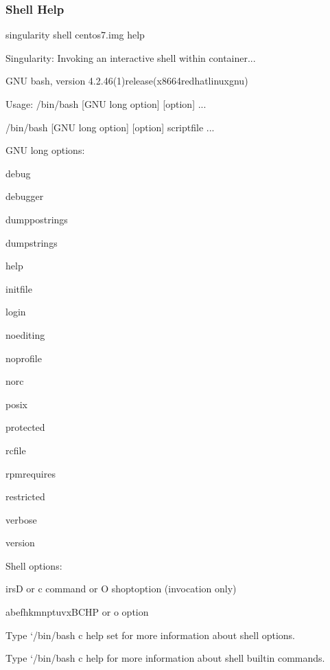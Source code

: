 \documentclass[letterpaper,10pt,english]{sphinxmanual}
\begin{document}
\subsubsection{Shell Help}
\label{\detokenize{appendix:shell-help}}
%
\begin{sphinxVerbatim}[commandchars=\\\{\}]
\PYGZdl{} singularity shell centos7.img \PYGZhy{}\PYGZhy{}help

Singularity: Invoking an interactive shell within container...


GNU bash, version 4.2.46(1)\PYGZhy{}release\PYGZhy{}(x86\PYGZus{}64\PYGZhy{}redhat\PYGZhy{}linux\PYGZhy{}gnu)

Usage:  /bin/bash [GNU long option] [option] ...

    /bin/bash [GNU long option] [option] script\PYGZhy{}file ...

GNU long options:

    \PYGZhy{}\PYGZhy{}debug

    \PYGZhy{}\PYGZhy{}debugger

    \PYGZhy{}\PYGZhy{}dump\PYGZhy{}po\PYGZhy{}strings

    \PYGZhy{}\PYGZhy{}dump\PYGZhy{}strings

    \PYGZhy{}\PYGZhy{}help

    \PYGZhy{}\PYGZhy{}init\PYGZhy{}file

    \PYGZhy{}\PYGZhy{}login

    \PYGZhy{}\PYGZhy{}noediting

    \PYGZhy{}\PYGZhy{}noprofile

    \PYGZhy{}\PYGZhy{}norc

    \PYGZhy{}\PYGZhy{}posix

    \PYGZhy{}\PYGZhy{}protected

    \PYGZhy{}\PYGZhy{}rcfile

    \PYGZhy{}\PYGZhy{}rpm\PYGZhy{}requires

    \PYGZhy{}\PYGZhy{}restricted

    \PYGZhy{}\PYGZhy{}verbose

    \PYGZhy{}\PYGZhy{}version

Shell options:

    \PYGZhy{}irsD or \PYGZhy{}c command or \PYGZhy{}O shopt\PYGZus{}option      (invocation only)

    \PYGZhy{}abefhkmnptuvxBCHP or \PYGZhy{}o option

Type {}`/bin/bash \PYGZhy{}c \PYGZdq{}help set\PYGZdq{}\PYGZsq{} for more information about shell options.

Type {}`/bin/bash \PYGZhy{}c help\PYGZsq{} for more information about shell builtin commands.
\end{sphinxVerbatim}
\end{document}
